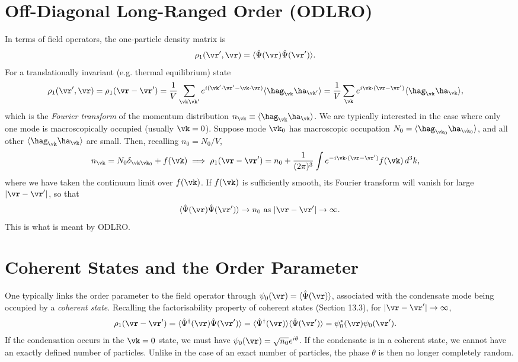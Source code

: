 \documentclass[a4paper, 11pt, normalem]{report}
\begin{document}
\section{Off-Diagonal Long-Ranged Order (ODLRO)}
In terms of field operators, the one-particle density matrix is
\begin{align}
    \rho_1(\vr',\vr) &= \langle\hat{\Psi}(\vr)\hat{\Psi}(\vr')\rangle.
\end{align}
For a translationally invariant (e.g. thermal equilibrium) state
\begin{align}
    \rho_1(\vr',\vr) &= \rho_1(\vr-\vr') = \frac{1}{V}\sum_{\vk\vk'} e^{i(\vk'\cdot\vr'-\vk\cdot\vr)}\langle\hag_{\vk}\ha_{\vk'}\rangle = \frac{1}{V}\sum_{\vk}e^{i\vk\cdot(\vr-\vr')}\langle\hag_{\vk}\ha_{\vk}\rangle,
\end{align}
which is the \emph{Fourier transform} of the momentum distribution $n_{\vk}\equiv \langle\hag_{\vk}\ha_{\vk}\rangle$.
We are typically interested in the case where only one mode is macroscopically occupied (usually $\vk=0$).
Suppose mode $\vk_0$ has macroscopic occupation $N_0=\langle\hag_{\vk_0}\ha_{\vk_0}\rangle$, and all other $\langle\hag_{\vk}\ha_{\vk}\rangle$ are small.
Then, recalling $n_0=N_0/V$,
\begin{align}
    n_{\vk} &= N_0\delta_{\vk\vk_0} + f(\vk) \implies \rho_1(\vr-\vr') = n_0 + \frac{1}{(2\pi)^3}\int e^{-i\vk\cdot(\vr-\vr')}f(\vk)\,d^3k,
\end{align}
where we have taken the continuum limit over $f(\vk)$.
If $f(\vk)$ is sufficiently smooth, its Fourier transform will vanish for large $|\vr-\vr'|$, so that
\begin{align}
    \langle\hat{\Psi}(\vr)\hat{\Psi}(\vr')\rangle \to n_0 \text{ as } |\vr-\vr'| \to \infty.
\end{align}
This is what is meant by ODLRO.

\section{Coherent States and the Order Parameter}
One typically links the order parameter to the field operator through $\psi_0(\vr)=\langle\hat{\Psi}(\vr)\rangle$, associated with the condensate mode being occupied by a \emph{coherent state}.
Recalling the factorisability property of coherent states (Section 13.3), for $|\vr-\vr'|\to\infty$,
\begin{align}
    \rho_1(\vr-\vr') &= \langle\hat{\Psi}^\dagger(\vr)\hat{\Psi}(\vr')\rangle = \langle\hat{\Psi}^\dagger(\vr)\rangle\langle\hat{\Psi}(\vr')\rangle = \psi_0^*(\vr)\psi_0(\vr').
\end{align}
If the condensation occurs in the $\vk=0$ state, we must have $\psi_0(\vr)=\sqrt{n_0}e^{i\theta}$.
If the condensate is in a coherent state, we cannot have an exactly defined number of particles.
Unlike in the case of an exact number of particles, the phase $\theta$ is then no longer completely random.
\end{document}
